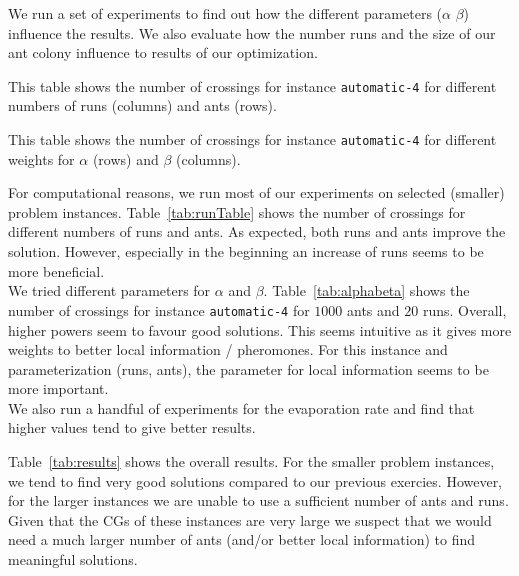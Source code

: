 \documentclass{scrartcl}
\begin{document}
We run a set of experiments to find out how the different parameters
($\alpha$ $\beta$) influence the results. We also evaluate how the
number runs and the size of our ant colony influence to results of our
optimization. \\


\begin{table}[!H]
\centering
\scriptsize  

\caption{This table shows the number of crossings for instance \texttt{automatic-4} for
different numbers of runs (columns) and ants (rows).}
\label{tab:runTable}
\end{table}


\begin{table}[!H]
\centering
\scriptsize  

\caption{This table shows the number of crossings for instance \texttt{automatic-4} for
different weights for $\alpha$ (rows) and $\beta$ (columns).}
\label{tab:alphabeta}
\end{table}


For computational reasons, we run most of our experiments on selected
(smaller) problem instances. Table~\ref{tab:runTable} shows the number
of crossings for different numbers of runs and ants. As expected, both
runs and ants improve the solution. However, especially in the
beginning an increase of runs seems to be more beneficial.\\

We tried different parameters for $\alpha$ and
$\beta$. Table~\ref{tab:alphabeta} shows the number of crossings for
instance \texttt{automatic-4} for $1000$ ants and $20$ runs.  Overall,
higher powers seem to favour good solutions. This seems intuitive as
it gives more weights to better local information / pheromones. For
this instance and parameterization (runs, ants), the parameter for
local information seems to be more important. \\

We also run a handful of experiments for the evaporation rate and find that
higher values tend to give better results.

Table~\ref{tab:results} shows the overall results. For the smaller
problem instances, we tend to find very good solutions compared to our
previous exercies. However, for the larger instances we are unable to
use a sufficient number of ants and runs. Given that the CGs of these
instances are very large we suspect that we would need a much larger
number of ants (and/or better local information) to find meaningful
solutions.


\clearpage
\end{document}
